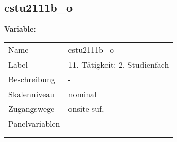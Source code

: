 	
	
	\subsection{cstu2111b\_o}
	\label{subSection:cstu2111b_o}

	\noindent\textbf{Variable:}\\
		\begin{tabular}{lL{11.3cm}}
			\label{tableVariable:cstu2111b_o}
			Name & cstu2111b\_o \\
			Label & 11. Tätigkeit: 2. Studienfach \\
			Beschreibung & - \\
			Skalenniveau & nominal \\
			Zugangswege &
				onsite-suf,
 \\
			Panelvariablen & -
			 \\
			 \\
 \\
		\end{tabular}






